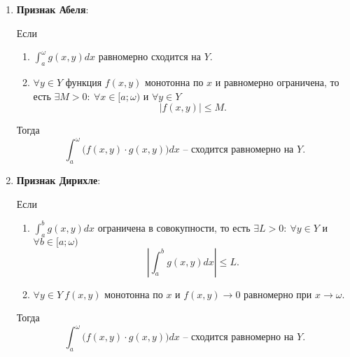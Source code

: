 \begin{theorem}\leavevmode
    \begin{enumerate}
        \item \textbf{Признак Абеля}:

              Если \begin{enumerate}
                  \item $\int_{a}^{\omega}g(x,y)dx$ равномерно сходится на $Y$.
                  \item $\forall y \in Y$ функция $f(x,y)$ монотонна по $x$ и равномерно ограничена, то есть $\exists M > 0: \ \forall x \in [a;\omega)$ и $\forall y \in Y$
                        \[
                            \left|f(x,y)\right| \leqslant M.
                        \]
              \end{enumerate}

              Тогда
              \[
                  \int_{a}^{\omega}\big(f(x,y) \cdot g(x,y)\big)dx \text{ -- сходится равномерно на }Y.
              \]

        \item \textbf{Признак Дирихле}:

              Если
              \begin{enumerate}
                  \item $\int_{a}^{b}g(x,y)dx$ ограничена в совокупности, то есть $\exists L > 0: \ \forall y \in Y$ и $\forall b \in [a;\omega)$
                        \[
                            \left|\int_{a}^{b}g(x,y)dx\right| \leqslant L.
                        \]
                  \item $\forall y \in Y \ f(x,y)$ монотонна по $x$ и $f(x,y) \rightarrow 0$ равномерно при $x \rightarrow \omega$.
              \end{enumerate}

              Тогда
              \[
                  \int_{a}^{\omega}\big(f(x,y)\cdot g(x,y)\big)dx \text{ -- сходится равномерно на } Y.
              \]
    \end{enumerate}
\end{theorem}

